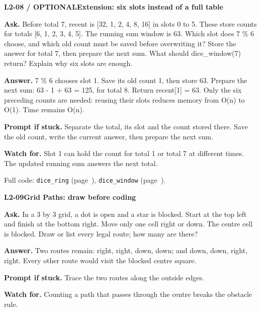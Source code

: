 \documentclass[11pt,a4paper]{article}
\begin{document}
\par\medskip
\noindent\begin{minipage}{\textwidth}
{\color{teal}\textbf{L2-08 / OPTIONAL}}\quad \textbf{Extension: six slots instead of a full table}\par\smallskip
\textbf{Ask.} Before total 7, recent is [32, 1, 2, 4, 8, 16] in slots 0 to 5. These store counts for totals [6, 1, 2, 3, 4, 5]. The running sum window is 63. Which slot does 7 \% 6 choose, and which old count must be saved before overwriting it? Store the answer for total 7, then prepare the next sum. What should dice\_window(7) return? Explain why six slots are enough.\par\smallskip
\textbf{Answer.} 7 \% 6 chooses slot 1. Save its old count 1, then store 63. Prepare the next sum: 63 - 1 + 63 = 125, for total 8. Return recent[1] = 63. Only the six preceding counts are needed: reusing their slots reduces memory from O(n) to O(1). Time remains O(n).\par\smallskip
\textbf{Prompt if stuck.} Separate the total, its slot and the count stored there. Save the old count, write the current answer, then prepare the next sum.\par\smallskip
\textbf{Watch for.} Slot 1 can hold the count for total 1 or total 7 at different times. The updated running sum answers the next total.\par\smallskip Full code: \texttt{dice\_ring} (page~\pageref{L2-code-dice_ring}), \texttt{dice\_window} (page~\pageref{L2-code-dice_window}).
\end{minipage}\par{}\medskip

\par\medskip
\noindent\begin{minipage}{\textwidth}
{\color{teal}\textbf{L2-09}}\quad \textbf{Grid Paths: draw before coding}\par\smallskip
\textbf{Ask.} In a 3 by 3 grid, a dot is open and a star is blocked. Start at the top left and finish at the bottom right. Move only one cell right or down. The centre cell is blocked. Draw or list every legal route; how many are there?\par\smallskip
\textbf{Answer.} Two routes remain: right, right, down, down; and down, down, right, right. Every other route would visit the blocked centre square.\par\smallskip
\textbf{Prompt if stuck.} Trace the two routes along the outside edges.\par\smallskip
\textbf{Watch for.} Counting a path that passes through the centre breaks the obstacle rule.
\end{minipage}\par{}\medskip
\end{document}
